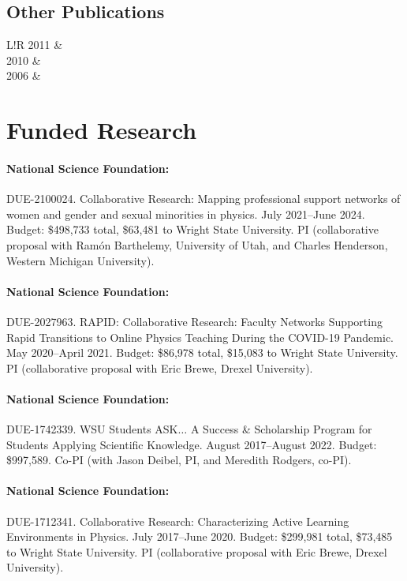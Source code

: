 \documentclass[10pt]{article}
\newcommand\VRule{\color{lightgray}\vrule width 0.5pt}
\begin{document}
\subsection*{Other Publications}
\begin{tabular}{L!{\VRule}R}
2011	& \\[5pt]
2010 	& \\[5pt]
2006 	& \\%
\end{tabular}
 
\section*{Funded Research}

\paragraph{National Science Foundation:} DUE-2100024. Collaborative Research: Mapping professional support networks of women and gender and sexual minorities in physics. July 2021--June 2024. Budget: \$498,733 total, \$63,481 to Wright State University. PI (collaborative proposal with Ram\'{o}n Barthelemy, University of Utah, and Charles Henderson, Western Michigan University).

\paragraph{National Science Foundation:} DUE-2027963. RAPID: Collaborative Research: Faculty Networks Supporting Rapid Transitions to Online Physics Teaching During the COVID-19 Pandemic. May 2020--April 2021. Budget: \$86,978 total, \$15,083 to Wright State University. PI (collaborative proposal with Eric Brewe, Drexel University).

\paragraph{National Science Foundation:} DUE-1742339. WSU Students ASK$\ldots$ A Success \& Scholarship Program for Students Applying Scientific Knowledge. August 2017--August 2022. Budget: \$997,589. Co-PI (with Jason Deibel, PI, and Meredith Rodgers, co-PI).

\paragraph{National Science Foundation:} DUE-1712341. Collaborative Research: Characterizing Active Learning Environments in Physics. July 2017--June 2020. Budget: \$299,981 total, \$73,485 to Wright State University. PI (collaborative proposal with Eric Brewe, Drexel University).
\end{document}
